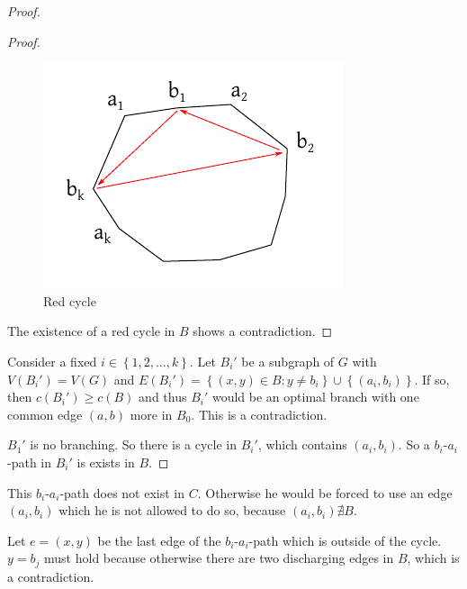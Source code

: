 \documentclass[a4paper]{article}
\theoremstyle{definition}
\newcommand{\set}[1]{\left\{#1\right\}}
\newcommand{\gath}[2]{$#1$-$#2$-path} %
\begin{document}
\begin{proof}
\begin{proof}
\begin{figure}[ht]
  \begin{center}
    \includegraphics{img/red_cycle.pdf}
    \caption{Red cycle}
  \end{center}
\end{figure}

The existence of a red cycle in $B$ shows a contradiction.
\end{proof}

Consider a fixed $i \in \set{1, 2, \ldots, k}$.
Let $B_i'$ be a subgraph of $G$ with $V(B_i') = V(G)$ and $E(B_i') = \set{(x, y) \in B: y \neq b_i} \cup \set{(a_i, b_i)}$. If so, then $c(B_i') \geq c(B)$ and thus $B_i'$ would be an optimal branch with one common edge $(a, b)$ more in $B_0$. This is a contradiction.

$B_1'$ is no branching. So there is a cycle in $B_i'$, which contains $(a_i, b_i)$. So a \gath{b_i}{a_i} in $B_i'$ is exists in $B$.
\end{proof}

This \gath{b_i}{a_i} does not exist in $C$. Otherwise he would be forced to use an edge $(a_i, b_i)$ which he is not allowed to do so, because $(a_i, b_i) \nexists B$.

Let $e = (x, y)$ be the last edge of the \gath{b_i}{a_i} which is outside of the cycle. $y = b_j$ must hold because otherwise there are two discharging edges in $B$, which is a contradiction.
\end{document}
